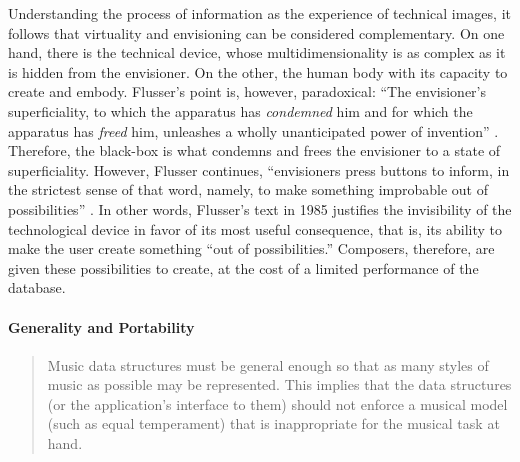 	Understanding the process of information as the experience of technical images, it follows that virtuality and envisioning can be considered complementary. On one hand, there is the technical device, whose multidimensionality is as complex as it is hidden from the envisioner. On the other, the human body with its capacity to create and embody. Flusser's point is, however, paradoxical: ``The envisioner's superficiality, to which the apparatus has \textit{condemned} him and for which the apparatus has \textit{freed} him, unleashes a wholly unanticipated power of invention'' \im \parencite[37]{Flu11:Int}. Therefore, the black-box is what condemns and frees the envisioner to a state of superficiality. However, Flusser continues, ``envisioners press buttons to inform, in the strictest sense of that word, namely, to make something improbable out of possibilities'' \parencite[37]{Flu11:Int}. In other words, Flusser's text in 1985 justifies the invisibility of the technological device in favor of its most useful consequence, that is, its ability to make the user create something ``out of possibilities.'' Composers, therefore, are given these possibilities to create, at the cost of a limited performance of the database.

	\paragraph{Generality and Portability}
	\label{computer:free}

	\begin{quote}
		Music data structures must be general enough so that as many styles of music as possible may be represented. This implies that the data structures (or the application's interface to them) should not enforce a musical model (such as equal temperament) that is inappropriate for the musical task at hand. \parencite[318]{icmc/bbp2372.1987.046}
	\end{quote}

